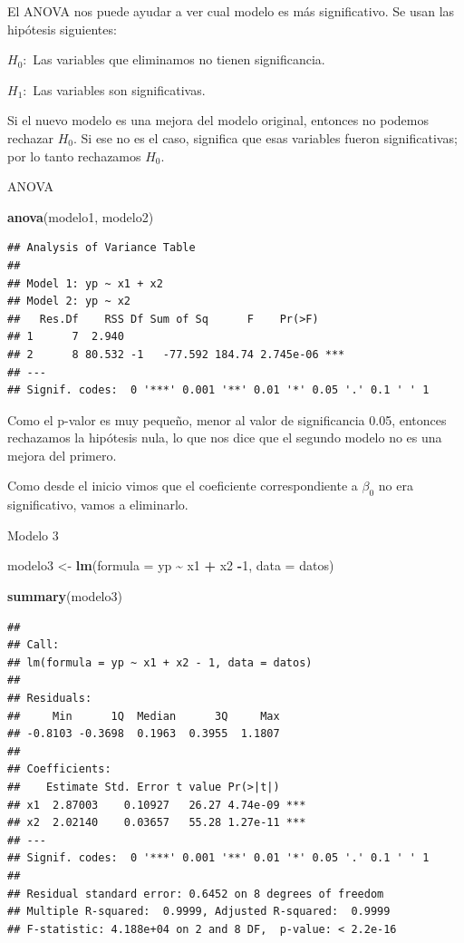 \documentclass[
]{book}
\newenvironment{Shaded}{\begin{snugshade}}{\end{snugshade}}
\newcommand{\AttributeTok}[1]{\textcolor[rgb]{0.13,0.29,0.53}{#1}}
\newcommand{\DecValTok}[1]{\textcolor[rgb]{0.00,0.00,0.81}{#1}}
\newcommand{\FunctionTok}[1]{\textcolor[rgb]{0.13,0.29,0.53}{\textbf{#1}}}
\newcommand{\NormalTok}[1]{#1}
\newcommand{\OtherTok}[1]{\textcolor[rgb]{0.56,0.35,0.01}{#1}}
\newcommand{\SpecialCharTok}[1]{\textcolor[rgb]{0.81,0.36,0.00}{\textbf{#1}}}
\begin{document}
El ANOVA nos puede ayudar a ver cual modelo es más significativo. Se usan las hipótesis siguientes:

\(H_0:\) Las variables que eliminamos no tienen significancia.

\(H_1:\) Las variables son significativas.

Si el nuevo modelo es una mejora del modelo original, entonces no podemos rechazar \(H_0\). Si ese no es el caso, significa que esas variables fueron significativas; por lo tanto rechazamos \(H_0\).

ANOVA

\begin{Shaded}
\begin{Highlighting}[]
\FunctionTok{anova}\NormalTok{(modelo1, modelo2)}
\end{Highlighting}
\end{Shaded}

\begin{verbatim}
## Analysis of Variance Table
## 
## Model 1: yp ~ x1 + x2
## Model 2: yp ~ x2
##   Res.Df    RSS Df Sum of Sq      F    Pr(>F)    
## 1      7  2.940                                  
## 2      8 80.532 -1   -77.592 184.74 2.745e-06 ***
## ---
## Signif. codes:  0 '***' 0.001 '**' 0.01 '*' 0.05 '.' 0.1 ' ' 1
\end{verbatim}

Como el p-valor es muy pequeño, menor al valor de significancia 0.05, entonces rechazamos la hipótesis nula, lo que nos dice que el segundo modelo no es una mejora del primero.

Como desde el inicio vimos que el coeficiente correspondiente a \(\beta_0\) no era significativo, vamos a eliminarlo.

Modelo 3

\begin{Shaded}
\begin{Highlighting}[]
\NormalTok{modelo3 }\OtherTok{\textless{}{-}} \FunctionTok{lm}\NormalTok{(}\AttributeTok{formula =}\NormalTok{ yp }\SpecialCharTok{\textasciitilde{}}\NormalTok{ x1 }\SpecialCharTok{+}\NormalTok{ x2 }\SpecialCharTok{{-}}\DecValTok{1}\NormalTok{, }\AttributeTok{data =}\NormalTok{ datos)}

\FunctionTok{summary}\NormalTok{(modelo3)}
\end{Highlighting}
\end{Shaded}

\begin{verbatim}
## 
## Call:
## lm(formula = yp ~ x1 + x2 - 1, data = datos)
## 
## Residuals:
##     Min      1Q  Median      3Q     Max 
## -0.8103 -0.3698  0.1963  0.3955  1.1807 
## 
## Coefficients:
##    Estimate Std. Error t value Pr(>|t|)    
## x1  2.87003    0.10927   26.27 4.74e-09 ***
## x2  2.02140    0.03657   55.28 1.27e-11 ***
## ---
## Signif. codes:  0 '***' 0.001 '**' 0.01 '*' 0.05 '.' 0.1 ' ' 1
## 
## Residual standard error: 0.6452 on 8 degrees of freedom
## Multiple R-squared:  0.9999, Adjusted R-squared:  0.9999 
## F-statistic: 4.188e+04 on 2 and 8 DF,  p-value: < 2.2e-16
\end{verbatim}
\end{document}
